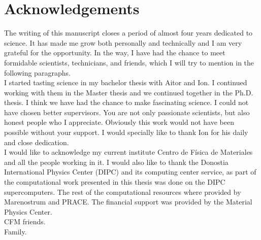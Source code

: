 
\chapter*{Acknowledgements} %

The writing of this manuscript closes a period of almost four years dedicated to science. It has made me grow both 
personally and technically and I am very grateful for the opportunity. In the way, I have had the chance to meet 
formidable scientists, technicians, and friends, which I will try to mention in the following paragraphs. \\

I started tasting science in my bachelor thesis with Aitor and Ion. I continued working with them in the Master 
thesis and we continued together in the Ph.D. thesis. I think we have had the chance to make fascinating science. I 
could not have chosen better supervisors. You are not only passionate scientists, but also honest people who I 
appreciate. Obviously this work would not have been possible without your support. I would specially like to thank 
Ion for his daily and close dedication. \\

I would like to acknowledge my current institute Centro de F\'isica de Materiales and all the people working in it. I 
would also like to thank the Donostia International Physics Center (DIPC) and its computing center service, as part 
of the computational work presented in this thesis was done on the DIPC supercomputers. The rest of the computational
resources where provided by Marenostrum and PRACE. The financial support was provided by the Material Physics 
Center. \\

CFM friends. \\

Family.
